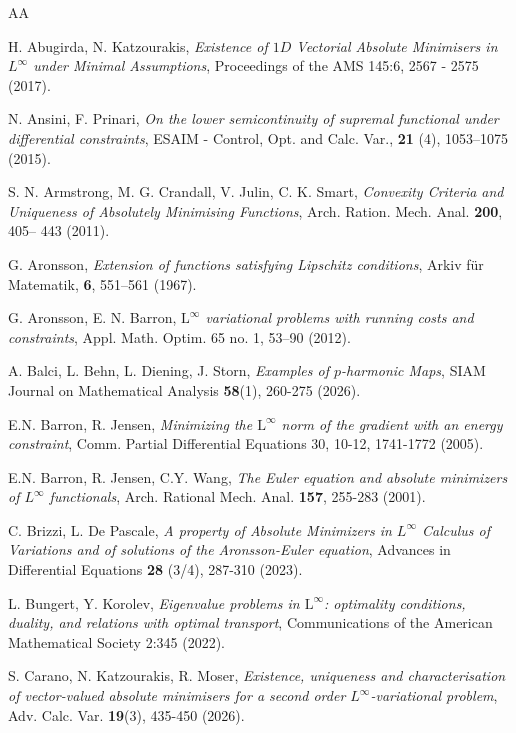 \documentclass[a4paper,11pt]{article}
\numberwithin{equation}{section}
\theoremstyle{definition}
\begin{document}
\begin{thebibliography}{AA} 

 H. Abugirda, N. Katzourakis, \emph{Existence of $1D$ Vectorial Absolute Minimisers in $L^\infty$ under Minimal Assumptions}, Proceedings of the AMS 145:6, 2567 - 2575 (2017).

   N. Ansini, F. Prinari, \emph{On the lower semicontinuity of supremal functional under differential constraints}, ESAIM - Control, Opt. and Calc. Var., \textbf{21} (4), 1053--1075 (2015).
  
S. N. Armstrong, M. G. Crandall, V. Julin, C. K. Smart, {\it Convexity Criteria and
Uniqueness of Absolutely Minimising Functions}, Arch. Ration. Mech. Anal. {\bf 200}, 405–
443 (2011).

  G. Aronsson, \emph{Extension of functions satisfying Lipschitz conditions}, Arkiv f\"ur Matematik, \textbf{6}, 551--561 (1967).
  
  G. Aronsson, E. N. Barron, \emph{$\mathrm L^\infty$ variational problems with running costs and constraints}, Appl. Math. Optim. 65 no. 1, 53--90 (2012).  

{A. Balci, L. Behn, L. Diening, J. Storn,} {\it {Examples of \({p}\)-harmonic Maps}}, {SIAM Journal on Mathematical Analysis} {\bf 58}(1), 260-275 (2026).

 E.N. Barron, R. Jensen, \emph{Minimizing the $\mathrm L^{\infty}$ norm of the gradient with an energy constraint}, Comm. Partial Differential Equations 30, 10-12, 1741-1772 (2005).

E.N. Barron, R. Jensen, C.Y. Wang, {\it The Euler equation and absolute minimizers of $L^\infty$ functionals}, Arch. Rational
Mech. Anal. {\bf 157}, 255-283 (2001).

 C. Brizzi, L. De Pascale, \emph{A property of Absolute Minimizers in $ L^{\infty}$  Calculus of Variations and of solutions of the Aronsson-Euler equation}, Advances in Differential Equations {\bf 28} (3/4), 287-310 (2023).
 
 L. Bungert, Y. Korolev, \emph{Eigenvalue problems in $\mathrm L^{\infty}$: optimality conditions, duality, and relations with optimal transport}, Communications of the American Mathematical Society 2:345  (2022).

S. Carano, N. Katzourakis, R. Moser, \emph{
Existence, uniqueness and characterisation of vector-valued absolute minimisers for a second order $L^\infty$-variational problem}, Adv. Calc. Var. {\bf 19}(3), 435-450 (2026).


\end{thebibliography}
\end{document}

